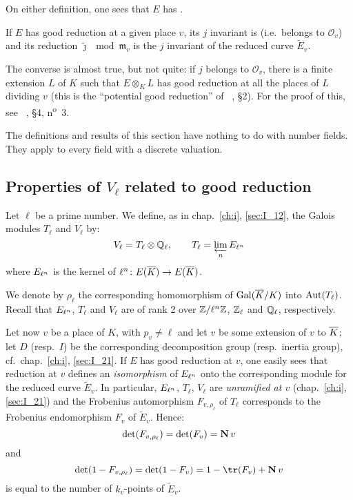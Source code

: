 On either definition, one sees that $E$ has .

If $E$ has good reduction at a given place $v$, its $j$ invariant is
 (i.e.\ belongs to $\mathcal{O}_v$) and its reduction
$\tilde\jmath \mod{\mathfrak{m}_v}$ is the $j$ invariant of the reduced curve
$\widetilde{E}_v$.

The converse is almost true, but not quite: if $j$ belongs to $\mathcal{O}_v$,
there is a finite extension $L$ of $K$ such that $E \otimes_K L$ has good
reduction at all the places of $L$ dividing $v$ (this is the ``potential good
reduction'' of \citeauthor{32}~\cite{32}, \S 2). For the proof of this, see
\citeauthor{29}~\cite{29}, \S 4, n\textsuperscript{o}~3.

\begin{obs}
The definitions and results of this section have nothing to do with number
fields. They apply to every field with a discrete valuation.
\end{obs}

\subsection{Properties of \texorpdfstring{$V_\ell$}{Vℓ} related to good
reduction}\label{sec:IV_13}
Let $\ell$ be a prime number. We define, as in chap.~\ref{ch:i},
\ref{sec:I_12}, the Galois modules $T_\ell$ and $V_\ell$ by:
\[
	V_\ell = T_\ell \otimes \mathbb{Q}_\ell, \qquad T_\ell = \varprojlim_n
	{E}_{\ell^n}
\]
where ${E}_{\ell^n}$ is the kernel of $\ell^n \colon E(\overline{K}) \to
E(\overline{K})$.
\dpage

We denote by $\rho_\ell$ the corresponding homomorphism of $\operatorname{Gal}(\overline{K}/K)$
into $\operatorname{Aut}(T_\ell)$. Recall that ${E}_{\ell^n}$, $T_\ell$ and $V_\ell$ are
of rank 2 over $\mathbb{Z}/\ell^n\mathbb{Z}$, $\mathbb{Z}_\ell$ and $\mathbb{Q}_\ell$, respectively.

Let now $v$ be a place of $K$, with $p_v \ne \ell$ and let $v$ be some
extension of $v$ to $\overline{K}$; let $D$ (resp.\ $I$) be the corresponding
decomposition group (resp.\ inertia group), cf.\ chap.~\ref{ch:i},
\ref{sec:I_21}. If $E$ has good reduction at $v$, one easily sees that
reduction at $v$ defines an \emph{isomorphism} of ${E}_{\ell^n}$ onto the
corresponding module for the reduced curve $\widetilde{E}_v$. In particular,
${E}_{\ell^n}$, $T_\ell$, $V_\ell$ are \emph{unramified at $v$}
(chap.~\ref{ch:i}, \ref{sec:I_21}) and the Frobenius automorphism $F_{v,
\rho_\ell}$ of $T_\ell$ corresponds to the Frobenius endomorphism $F_v$ of
$\widetilde{E}_v$. Hence: 
\[
	\det(F_{v, \rho_\ell}) = \det(F_v) = \operatorname{\mathbf{N}} v
\]
and
\[
	\det(1 - F_{v, \rho_\ell}) = \det(1 - F_v) = 1 - \tr(F_v) + \numnorm v
\]
is equal to the number of $k_v$-points of $\widetilde{E}_v$.

